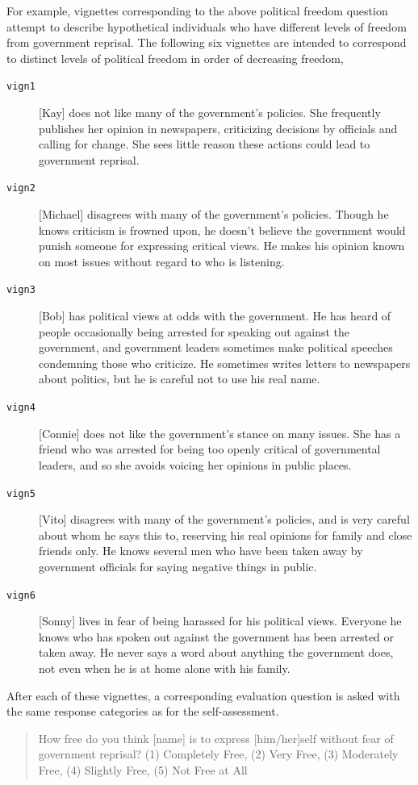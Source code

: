 \documentclass{amsart}
\newcommand{\code}[1]{{\texttt{#1}}}
\begin{document}
For example, vignettes corresponding to the above political freedom
question attempt to describe hypothetical individuals who have
different levels of freedom from government reprisal.  The following
six vignettes are intended to correspond to distinct levels of
political freedom in order of decreasing freedom,
\begin{description}
 \item[\code{vign1}]  [Kay] does not like many of the government's
 policies. She frequently publishes her opinion in newspapers,
 criticizing decisions by officials and calling for change. She sees
 little reason these actions could lead to government reprisal.

 \item[\code{vign2}]  [Michael] disagrees with many of the government's
 policies. Though he knows criticism is frowned upon, he doesn't
 believe the government would punish someone for expressing critical
 views. He makes his opinion known on most issues without regard to
 who is listening.

 \item[\code{vign3}]  [Bob] has political views at odds with the
 government. He has heard of people occasionally being arrested for
 speaking out against the government, and government leaders
 sometimes make political speeches condemning those who criticize. He
 sometimes writes letters to newspapers about politics, but he is
 careful not to use his real name.

 \item[\code{vign4}]  [Connie] does not like the government's stance on many
 issues. She has a friend who was arrested for being too openly
 critical of governmental leaders, and so she avoids voicing her
 opinions in public places.

 \item[\code{vign5}]  [Vito] disagrees with many of the government's
 policies, and is very careful about whom he says this to, reserving
 his real opinions for family and close friends only. He knows
 several men who have been taken away by government officials for
 saying negative things in public.

 \item[\code{vign6}]  [Sonny] lives in fear of being harassed for his
 political views. Everyone he knows who has spoken out against the
 government has been arrested or taken away. He never says a word
 about anything the government does, not even when he is at home
 alone with his family. 
\end{description}
After each of these vignettes, a corresponding evaluation question is
asked with the same response categories as for the self-assessment.
\begin{quote}
 How free do you think [name] is to express
  [him/her]self without fear of government reprisal?  (1) Completely
  Free, (2) Very Free, (3) Moderately Free, (4) Slightly Free, (5) Not
  Free at All
\end{quote}
\end{document}
